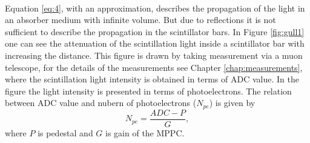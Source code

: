 \documentclass[a4paper]{article}\linespread{1.4}
\begin{document}
\\Equation \ref{eq:4}, with an approximation, describes the propagation of the light in an absorber medium with infinite volume. But due to reflections it is not sufficient to describe the propagation in the scintillator bars.
In Figure \ref{fig:gull1} one can see the attenuation of the scintillation light inside a scintillator bar with increasing the distance.
This figure is drawn by taking measurement via a muon telescope, for the details of the measurements see Chapter \ref{chap:measurements}, where the scintillation light intensity is obtained in terms of ADC value. In the figure the light intensity is presented in terms of photoelectrons. The relation between ADC value and nubern of photoelectrons ($N_{pe}$) is given by
\begin{equation} N_{pe} = \frac{ADC-P}{G} \label{eq:i1i2},\end{equation} where $P$ is pedestal and $G$ is gain of the MPPC. 
\end{document}
